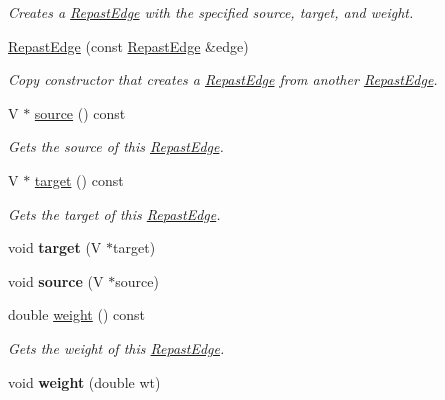 \begin{DoxyCompactItemize}
\begin{DoxyCompactList}\small\item\em Creates a \hyperlink{classrepast_1_1_repast_edge}{Repast\-Edge} with the specified source, target, and weight. \end{DoxyCompactList}\item 
\hypertarget{classrepast_1_1_repast_edge_aad7896812a552f85f70993c136b50f22}{\hyperlink{classrepast_1_1_repast_edge_aad7896812a552f85f70993c136b50f22}{Repast\-Edge} (const \hyperlink{classrepast_1_1_repast_edge}{Repast\-Edge} \&edge)}\label{classrepast_1_1_repast_edge_aad7896812a552f85f70993c136b50f22}

\begin{DoxyCompactList}\small\item\em Copy constructor that creates a \hyperlink{classrepast_1_1_repast_edge}{Repast\-Edge} from another \hyperlink{classrepast_1_1_repast_edge}{Repast\-Edge}. \end{DoxyCompactList}\item 
V $\ast$ \hyperlink{classrepast_1_1_repast_edge_a9b8886cb5295f847eccf9743a5f5b0a1}{source} () const 
\begin{DoxyCompactList}\small\item\em Gets the source of this \hyperlink{classrepast_1_1_repast_edge}{Repast\-Edge}. \end{DoxyCompactList}\item 
V $\ast$ \hyperlink{classrepast_1_1_repast_edge_a971ec6e45b597d2068ac42125f1b4657}{target} () const 
\begin{DoxyCompactList}\small\item\em Gets the target of this \hyperlink{classrepast_1_1_repast_edge}{Repast\-Edge}. \end{DoxyCompactList}\item 
\hypertarget{classrepast_1_1_repast_edge_a6b9889dbf6373654471c555c23dda130}{void {\bfseries target} (V $\ast$target)}\label{classrepast_1_1_repast_edge_a6b9889dbf6373654471c555c23dda130}

\item 
\hypertarget{classrepast_1_1_repast_edge_a1d4230ade56d772c452497a79d096adb}{void {\bfseries source} (V $\ast$source)}\label{classrepast_1_1_repast_edge_a1d4230ade56d772c452497a79d096adb}

\item 
double \hyperlink{classrepast_1_1_repast_edge_a6402b40ba110f9f531edf345399a8e74}{weight} () const 
\begin{DoxyCompactList}\small\item\em Gets the weight of this \hyperlink{classrepast_1_1_repast_edge}{Repast\-Edge}. \end{DoxyCompactList}\item 
\hypertarget{classrepast_1_1_repast_edge_aa620175d8226f8d19049e1f6a91560b6}{void {\bfseries weight} (double wt)}\label{classrepast_1_1_repast_edge_aa620175d8226f8d19049e1f6a91560b6}


\end{DoxyCompactItemize}
